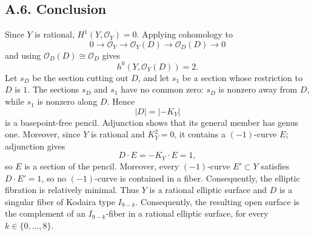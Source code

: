 \documentclass[11pt, reqno]{amsart}
\theoremstyle{definition}
\begin{document}
\subsection*{A.6. Conclusion}

Since \(Y\) is rational, \(H^1(Y,\mathcal O_Y)=0\).  Applying
cohomology to
\[
0\longrightarrow\mathcal O_Y
\longrightarrow\mathcal O_Y(D)
\longrightarrow\mathcal O_D(D)
\longrightarrow 0
\]
and using \(\mathcal O_D(D)\cong\mathcal O_D\) gives
\[
h^0(Y,\mathcal O_Y(D))=2.
\]
Let \(s_D\) be the section cutting out \(D\), and let \(s_1\) be a
section whose restriction to \(D\) is \(1\).  The sections \(s_D\) and
\(s_1\) have no common zero: \(s_D\) is nonzero away from \(D\), while
\(s_1\) is nonzero along \(D\).  Hence
\[
|D|=|-K_Y|
\]
is a basepoint-free pencil.  Adjunction shows that its general member
has genus one.  Moreover, since \(Y\) is rational and \(K_Y^2=0\), it
contains a \((-1)\)-curve \(E\); adjunction gives
\[
D\cdot E=-K_Y\cdot E=1,
\]
so \(E\) is a section of the pencil.  Moreover, every $(-1)$-curve $E'\subset Y$ satisfies
$D\cdot E'=1$, so no $(-1)$-curve is contained in a fiber.
Consequently, the elliptic fibration is relatively minimal. Thus $Y$ is a rational elliptic surface and $D$ is a singular fiber
of Kodaira type $I_{9-k}$. Consequently, the resulting open surface
is the complement of an $I_{9-k}$-fiber in a rational elliptic
surface, for every $k\in\{0,\ldots,8\}$.
\end{document}

